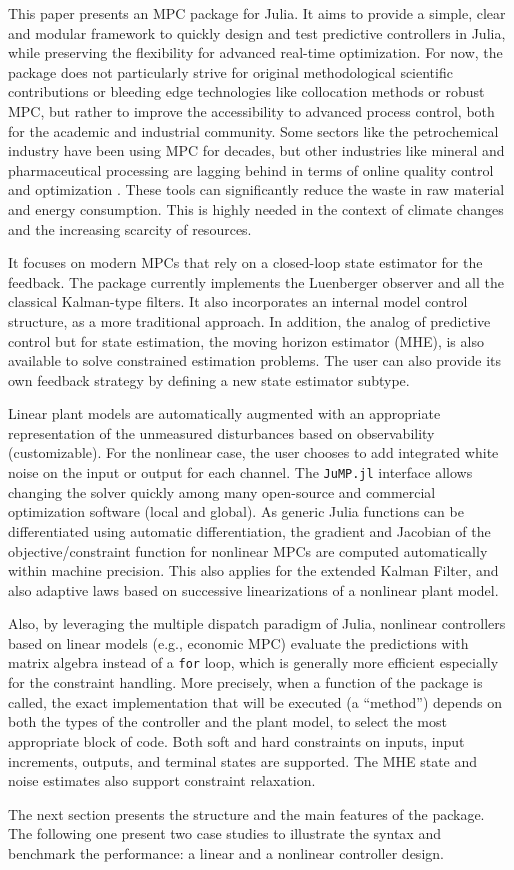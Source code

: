 This paper presents an MPC package for Julia. It aims to provide a simple, clear and modular framework to quickly design and test predictive controllers in Julia, while preserving the flexibility for advanced real-time optimization. For now, the package does not particularly strive for original methodological scientific contributions or bleeding edge technologies like collocation methods or robust MPC, but rather to improve the accessibility to advanced process control, both for the academic and industrial community. Some sectors like the petrochemical industry have been using MPC for decades, but other industries like mineral and pharmaceutical processing are lagging behind in terms of online quality control and optimization \citep{gapMPC, gapMPC2}. These tools can significantly reduce the waste in raw material and energy consumption. This is highly needed in the context of climate changes and the increasing scarcity of resources.

It focuses on modern MPCs that rely on a closed-loop state estimator for the feedback. The package currently implements the Luenberger observer and all the classical Kalman-type filters. It also incorporates an internal model control structure, as a more traditional approach. In addition, the analog of predictive control but for state estimation, the moving horizon estimator (MHE), is also available to solve constrained estimation problems. The user can also provide its own feedback strategy by defining a new state estimator subtype.

Linear plant models are automatically augmented with an appropriate representation of the unmeasured disturbances based on observability (customizable). For the nonlinear case, the user chooses to add integrated white noise on the input or output for each channel. The \texttt{JuMP.jl} interface allows changing the solver quickly among  many open-source and commercial optimization software (local and global). As generic Julia functions can be differentiated using automatic differentiation, the gradient and Jacobian of the objective/constraint function for nonlinear MPCs are computed automatically within machine precision. This also applies for the extended Kalman Filter, and also adaptive laws based on successive linearizations of a nonlinear plant model. 

Also, by leveraging the multiple dispatch paradigm of Julia, nonlinear controllers based on linear models (e.g., economic MPC) evaluate the predictions with matrix algebra instead of a \texttt{for} loop, which is generally more efficient especially for the constraint handling. More precisely, when a function of the package is called, the exact implementation that will be executed (a ``method'') depends on both the types of the controller and the plant model, to select the most appropriate block of code. Both soft and hard constraints on inputs, input increments, outputs, and terminal states are supported. The MHE state and noise estimates also support constraint relaxation.

The next section presents the structure and the main features of the package. The following one present two case studies to illustrate the syntax and benchmark the performance: a linear and a nonlinear controller design.